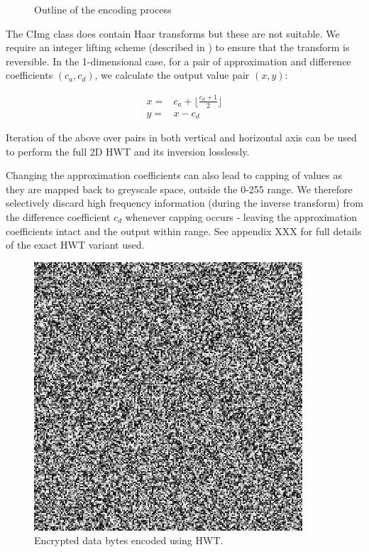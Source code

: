 \begin{figure}
\begin{center}

    
    
    \caption{Outline of the encoding process}
    \label{tikz:haar}
\end{center}
\end{figure}

The CImg class does contain Haar transforms but these are not suitable. We require an integer lifting scheme (described in \cite{XXX}) to ensure that the transform is reversible. In the 1-dimensional case, for a pair of approximation and difference coefficients $(c_a,c_d)$, we calculate the output value pair $(x,y)$: 

\begin{eqnarray}
    x = & c_a + \lfloor \frac{c_d+1}{2} \rfloor \nonumber \\ 
    y = & x - c_d
\end{eqnarray}

Iteration of the above over pairs in both vertical and horizontal axis can be used to perform the full 2D HWT and its inversion losslessly.

Changing the approximation coefficients can also lead to capping of values as they are mapped back to greyscale space, outside the 0-255 range. We therefore selectively discard high frequency information (during the inverse transform) from the difference coefficient $c_d$ whenever capping occurs - leaving the approximation coefficients intact and the output within range. See appendix XXX for full details of the exact HWT variant used.


    \begin{figure}[tbph]
        \begin{center}
                \includegraphics[width=10cm]{screens/haar.jpg}
            \caption{Encrypted data bytes encoded using HWT.}
            \label{scn:haar}
        \end{center}
    \end{figure}





